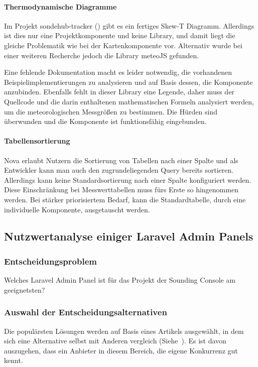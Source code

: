 \paragraph{Thermodynamische Diagramme}
Im Projekt sondehub-tracker (\cite{sondehub-tracker}) gibt es ein fertiges Skew-T Diagramm.
Allerdings ist dies nur eine Projektkomponente und keine Library, und damit liegt die gleiche Problematik wie bei der Kartenkomponente vor.
Alternativ wurde bei einer weiteren Recherche jedoch die Library meteoJS gefunden.

Eine fehlende Dokumentation macht es leider notwendig, die vorhandenen Beispielimplementierungen zu analysieren und auf Basis dessen, die Komponente anzubinden.
Ebenfalls fehlt in dieser Library eine Legende, daher muss der Quellcode und die darin enthaltenen mathematischen Formeln analysiert werden, um die meteorologischen Messgrößen zu bestimmen.
Die Hürden sind überwunden und die Komponente ist funktionsfähig eingebunden.

\paragraph{Tabellensortierung}
Nova erlaubt Nutzern die Sortierung von Tabellen nach einer Spalte und als Entwickler kann man auch den zugrundeliegenden Query bereits sortieren.
Allerdings kann keine Standardsortierung nach einer Spalte konfiguriert werden.
Diese Einschränkung bei Messwerttabellen muss fürs Erste so hingenommen werden.
Bei stärker priorisiertem Bedarf, kann die Standardtabelle, durch eine individuelle Komponente, ausgetauscht werden.

\subsection{Nutzwertanalyse einiger Laravel Admin Panels}

\subsubsection{Entscheidungsproblem}
Welches Laravel Admin Panel ist für das Projekt der Sounding Console am geeignetsten?

\subsubsection{Auswahl der Entscheidungsalternativen}
Die populärsten Lösungen werden auf Basis eines Artikels ausgewählt, in dem sich eine Alternative selbst mit Anderen vergleich (Siehe~\cite{the-guide-to-laravel-admin-panels}).
Es ist davon auszugehen, dass ein Anbieter in diesem Bereich, die eigene Konkurrenz gut kennt.

